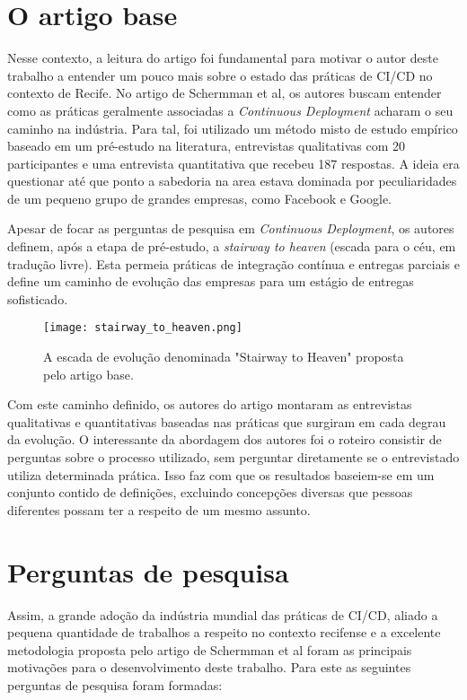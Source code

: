 
\section{O artigo base}
Nesse contexto, a leitura do artigo \cite{empiricalStudy2016} foi fundamental para motivar o autor deste trabalho a entender um pouco mais sobre o estado das práticas de CI/CD no contexto de Recife. No artigo de Schermman et al, os autores buscam entender como as práticas geralmente associadas a \emph{Continuous Deployment} acharam o seu caminho na indústria. Para tal, foi utilizado um método misto de estudo empírico baseado em um pré-estudo na literatura, entrevistas qualitativas com 20 participantes e uma entrevista quantitativa que recebeu 187 respostas. A ideia era questionar até que ponto a sabedoria na area estava dominada por peculiaridades de um pequeno grupo de grandes empresas, como Facebook e Google.

Apesar de focar as perguntas de pesquisa em \emph{Continuous Deployment}, os autores definem, após a etapa de pré-estudo, a \emph{stairway to heaven} (escada para o céu, em tradução livre). Esta  permeia práticas de integração contínua e entregas parciais e define um caminho de evolução das empresas para um estágio de entregas sofisticado. 

\begin{figure}[ht]
\begin{center}
\texttt{[image: stairway\_to\_heaven.png]}
\end{center}
\caption[Stairway to Heaven]{
    A escada de evolução denominada "Stairway to Heaven" proposta pelo artigo base.
}\label{fig_exe}
\end{figure}

Com este caminho definido, os autores do artigo montaram as entrevistas qualitativas e quantitativas baseadas nas práticas que surgiram em cada degrau da evolução. O interessante da abordagem dos autores foi o roteiro consistir de perguntas sobre o processo utilizado, sem perguntar diretamente se o entrevistado utiliza determinada prática. Isso faz com que os resultados baseiem-se em um conjunto contido de definições, excluindo concepções diversas que pessoas diferentes possam ter a respeito de um mesmo assunto.

\section{Perguntas de pesquisa} 
Assim, a grande adoção da indústria mundial das práticas de CI/CD, aliado a pequena quantidade de trabalhos a respeito no contexto recifense e a excelente metodologia proposta pelo artigo de Schermman et al \cite{empiricalStudy2016} foram as principais motivações para o desenvolvimento deste trabalho. Para este as seguintes perguntas de pesquisa foram formadas:

